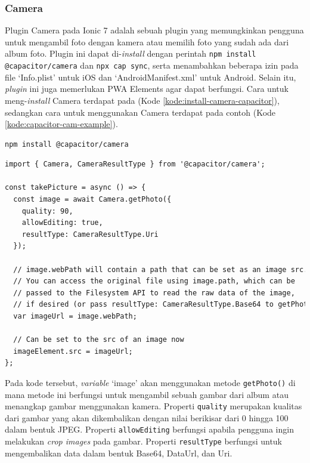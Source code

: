\subsubsection{Camera}
Plugin Camera pada Ionic 7 adalah sebuah plugin yang memungkinkan pengguna untuk mengambil foto dengan kamera atau memilih foto yang sudah ada dari album foto. Plugin ini dapat di-\textit{install} dengan perintah \texttt{npm install @capacitor/camera}  dan \texttt{npx cap sync}, serta menambahkan beberapa izin pada file `Info.plist' untuk iOS dan `AndroidManifest.xml' untuk Android. Selain itu, \textit{plugin} ini juga memerlukan PWA Elements agar dapat berfungsi. Cara untuk meng-\textit{install} Camera terdapat pada (Kode \ref{kode:install-camera-capacitor}), sedangkan cara untuk menggunakan Camera terdapat pada contoh (Kode \ref{kode:capacitor-cam-example}).

\begin{lstlisting}[language=HTML, caption=Kode untuk Menginstal Plugin Camera, label=kode:install-camera-capacitor]
npm install @capacitor/camera
\end{lstlisting}

\begin{lstlisting}[language=HTML, caption=Contoh Kode Capacitor Camera, label=kode:capacitor-cam-example]
import { Camera, CameraResultType } from '@capacitor/camera';

const takePicture = async () => {
  const image = await Camera.getPhoto({
    quality: 90,
    allowEditing: true,
    resultType: CameraResultType.Uri
  });

  // image.webPath will contain a path that can be set as an image src.
  // You can access the original file using image.path, which can be
  // passed to the Filesystem API to read the raw data of the image,
  // if desired (or pass resultType: CameraResultType.Base64 to getPhoto)
  var imageUrl = image.webPath;

  // Can be set to the src of an image now
  imageElement.src = imageUrl;
};
\end{lstlisting}

Pada kode tersebut, \textit{variable} `image' akan menggunakan metode \texttt{getPhoto()} di mana metode ini berfungsi untuk mengambil sebuah gambar dari album atau menangkap gambar menggunakan kamera. Properti \texttt{quality} merupakan kualitas dari gambar yang akan dikembalikan dengan nilai berikisar dari 0 hingga 100 dalam bentuk JPEG. Properti \texttt{allowEditing} berfungsi apabila pengguna ingin melakukan \textit{crop images} pada gambar. Properti \texttt{resultType} berfungsi untuk mengembalikan data dalam bentuk Base64, DataUrl, dan Uri.

